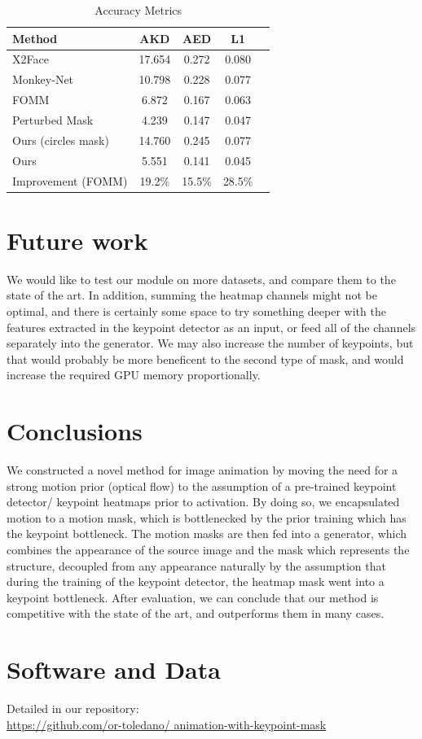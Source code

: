 \documentclass{article}
\begin{document}

\begin{table}[t]
\caption{Accuracy Metrics}
\label{table:results}
\vskip 0.15in
\begin{center}
\begin{small}
\begin{sc}
\begin{tabular}{lcccr}
\toprule
Method & AKD & AED & L1 \\
\midrule
X2Face    & 17.654 & 0.272 & 0.080 \\
Monkey-Net    & 10.798 & 0.228 & 0.077 \\
FOMM    & 6.872 & 0.167 & 0.063 \\
Perturbed Mask & 4.239 & 0.147 & 0.047 \\
Ours (circles mask) & 14.760& 0.245 & 0.077 \\
Ours & 5.551 & 0.141 &  0.045\\
\midrule
Improvement (FOMM)    & 19.2\% & 15.5\% & 28.5\% \\
\bottomrule
\end{tabular}
\end{sc}
\end{small}
\end{center}
\vskip -0.1in
\end{table}
\section{Future work}
We would like to test our module on more datasets, and compare them to the
state of the art. In addition, summing the heatmap channels might not be
optimal, and there is certainly some space to try something deeper with the
features extracted in the keypoint detector as an input, or feed all of the
channels separately into the generator.
We may also increase the number of keypoints, but that would probably be
more beneficent to the second type of mask, and would increase the
required GPU memory proportionally.

\section{Conclusions}
We constructed a novel method for image animation by moving the need for
a strong motion prior (optical flow) to the assumption of a pre-trained
keypoint detector/ keypoint heatmaps prior to activation.
By doing so, we encapsulated motion to a motion mask, which is
bottlenecked by the prior training which has the keypoint bottleneck.
The motion masks are then fed into a generator, which combines the
appearance of the source image and the mask which represents the structure,
decoupled from any appearance naturally by the assumption that during the
training of the keypoint detector, the heatmap mask went into a keypoint
bottleneck. After evaluation, we can conclude that our method is
competitive with the state of the art, and outperforms them in many cases.
\section*{Software and Data}
Detailed in our repository:
\\
\url{https://github.com/or-toledano/
animation-with-keypoint-mask}


\end{document}
